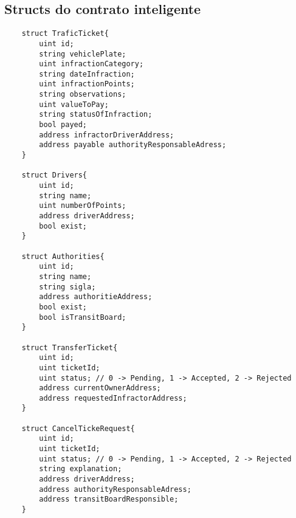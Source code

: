 \begin{apendicesenv}
\partapendices


\chapter{Structs do contrato inteligente}
\label{appendix:structs_smartContract}

\begin{verbatim}
    struct TraficTicket{
        uint id;
        string vehiclePlate;
        uint infractionCategory;
        string dateInfraction;
        uint infractionPoints;
        string observations;
        uint valueToPay;
        string statusOfInfraction; 
        bool payed;
        address infractorDriverAddress;
        address payable authorityResponsableAdress; 
    }

    struct Drivers{
        uint id;
        string name;
        uint numberOfPoints;
        address driverAddress;
        bool exist;
    }

    struct Authorities{
        uint id;
        string name;
        string sigla;
        address authoritieAddress;
        bool exist;
        bool isTransitBoard;
    }
    
    struct TransferTicket{
        uint id;
        uint ticketId;
        uint status; // 0 -> Pending, 1 -> Accepted, 2 -> Rejected
        address currentOwnerAddress;
        address requestedInfractorAddress;
    }
    
    struct CancelTickeRequest{
        uint id;
        uint ticketId;
        uint status; // 0 -> Pending, 1 -> Accepted, 2 -> Rejected
        string explanation;
        address driverAddress;
        address authorityResponsableAdress;
        address transitBoardResponsible;
    }
\end{verbatim}

\end{apendicesenv}
